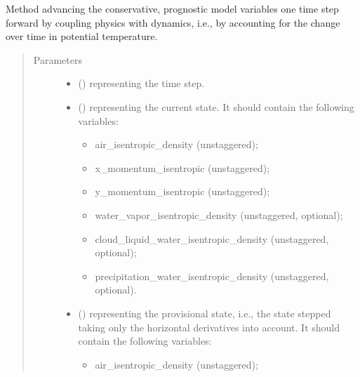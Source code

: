 \documentclass[letterpaper,10pt,english]{sphinxmanual}
\begin{document}
\begin{fulllineitems}
\begin{fulllineitems}
\label{\detokenize{api:dycore.prognostic_isentropic.PrognosticIsentropic.step_coupling_physics_with_dynamics}}
Method advancing the conservative, prognostic model variables one time step forward by coupling physics with
dynamics, i.e., by accounting for the change over time in potential temperature.
\begin{quote}\begin{description}
\item[{Parameters}] \leavevmode\begin{itemize}
\item {} 
 () \textendash{}  representing the time step.

\item {} 
 () \textendash{} 
{\hyperref[\detokenize{api:storages.state_isentropic.StateIsentropic}]{}} representing the current state.
It should contain the following variables:
\begin{itemize}
\item {} 
air\_isentropic\_density (unstaggered);

\item {} 
x\_momentum\_isentropic (unstaggered);

\item {} 
y\_momentum\_isentropic (unstaggered);

\item {} 
water\_vapor\_isentropic\_density (unstaggered, optional);

\item {} 
cloud\_liquid\_water\_isentropic\_density (unstaggered, optional);

\item {} 
precipitation\_water\_isentropic\_density (unstaggered, optional).

\end{itemize}


\item {} 
 () \textendash{} 
{\hyperref[\detokenize{api:storages.state_isentropic.StateIsentropic}]{}} representing the provisional state, i.e.,
the state stepped taking only the horizontal derivatives into account.
It should contain the following variables:
\begin{itemize}
\item {} 
air\_isentropic\_density (unstaggered);


\end{itemize}
\end{itemize}
\end{description}
\end{quote}
\end{fulllineitems}
\end{fulllineitems}
\end{document}
